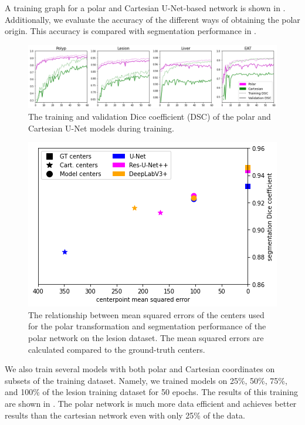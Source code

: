 
A training graph for a polar and Cartesian U-Net-based network is shown in . Additionally, we evaluate the accuracy of the different ways of obtaining the polar origin. This accuracy is compared with segmentation performance in . 

	\begin{figure}[h]
		\centering
		\includegraphics[width=\linewidth]{images/4/training-graphs}
		\caption{The training and validation Dice coefficient (DSC) of the polar and Cartesian U-Net models during training.}
		\label{fig:training}
	\end{figure}

	\begin{figure}[h]
		\centering
		\includegraphics[width=0.65\linewidth]{images/4/mse-vs-dice}
		\caption{The relationship between mean squared errors of the centers used for the polar transformation and segmentation performance of the polar network on the lesion dataset. The mean squared errors are calculated compared to the ground-truth centers.}
		\label{fig:centers-vs-performance}
	\end{figure}
	
We also train several models with both polar and Cartesian coordinates on subsets of the training dataset. Namely, we trained models on 25\%, 50\%, 75\%, and 100\% of the lesion training dataset for 50 epochs. The results of this training are shown in . The polar network is much more data efficient and achieves better results than the cartesian network even with only 25\% of the data.

